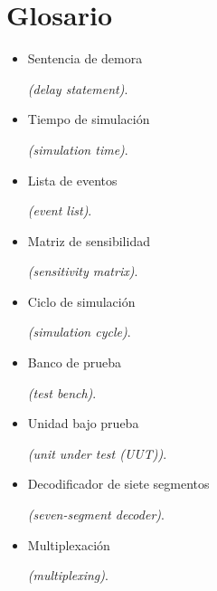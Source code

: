 \section{Glosario}

\begin{itemize}
    \item \hypertarget{delay_statement}{Sentencia de demora} \emph{(delay statement)}.
    \item \hypertarget{simulation_time}{Tiempo de simulación} \emph{(simulation time)}.
    \item \hypertarget{event_list}{Lista de eventos} \emph{(event list)}.
    \item \hypertarget{sensitivity_matrix}{Matriz de sensibilidad} \emph{(sensitivity matrix)}.
    \item \hypertarget{simulation_cycle}{Ciclo de simulación} \emph{(simulation cycle)}.
    \item \hypertarget{test_bench}{Banco de prueba} \emph{(test bench)}.
    \item \hypertarget{unit_under_test}{Unidad bajo prueba} \emph{(unit under test (UUT))}.
    \item \hypertarget{seven-segment_decoder}{Decodificador de siete segmentos} \emph{(seven-segment decoder)}.
    \item \hypertarget{multiplexing}{Multiplexación} \emph{(multiplexing)}.
\end{itemize}